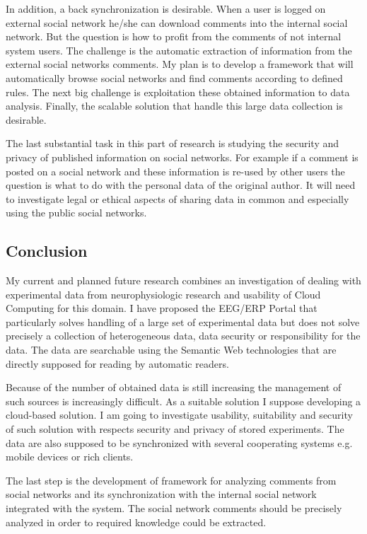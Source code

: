\documentclass[a4paper, 10pt]{article}
\begin{document}
In addition, a back synchronization is desirable. When a user is logged on external social network he/she can download comments into the internal social network. But the question is how to profit from the comments of not internal system users. The challenge is the automatic extraction of information from the external social networks comments. My plan is to develop a framework that will automatically browse social networks and find comments according to defined rules. The next big challenge is exploitation these obtained information to data analysis. Finally, the scalable solution that handle this large data collection is desirable.

The last substantial task in this part of research is studying the security and privacy of published information on social networks. For example if a comment is posted on a social network and these information is re-used by other users the question is what to do with the personal data of the original author. It will need to investigate legal or ethical aspects of sharing data in common and especially using the public social networks.

\subsection*{Conclusion}

My current and planned future research combines an investigation of dealing with experimental data from neurophysiologic research and usability of Cloud Computing for this domain. I have proposed the EEG/ERP Portal that particularly solves handling of a large set of experimental data but does not solve precisely a collection of heterogeneous data, data security or responsibility for the data. The data are searchable using the Semantic Web technologies that are directly supposed for reading by automatic readers.

Because of the number of obtained data is still increasing the management of such sources is increasingly difficult. As a suitable solution I suppose developing a cloud-based solution. I am going to investigate usability, suitability and security of such solution with respects security and privacy of stored experiments. The data are also supposed to be synchronized with several cooperating systems e.g. mobile devices or rich clients.

The last step is the development of framework for analyzing comments from social networks and its synchronization with the internal social network integrated with the system. The social network comments should be precisely analyzed in order to required knowledge could be extracted.
\end{document}
